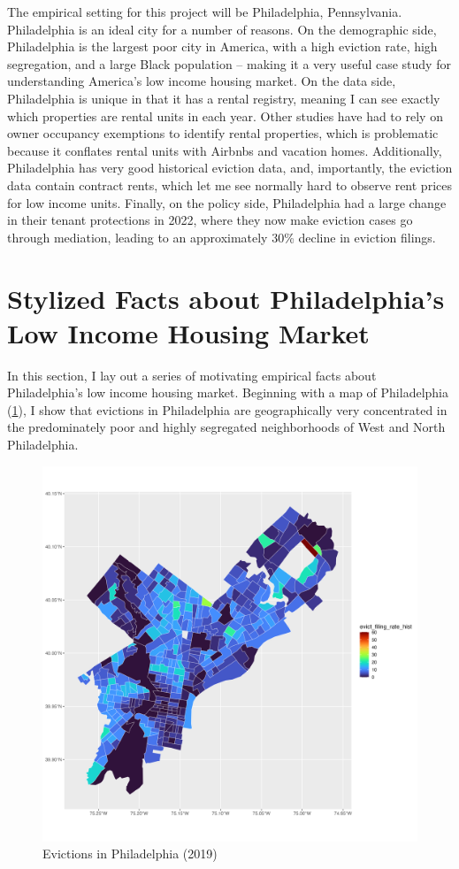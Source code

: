 \documentclass{article}
\begin{document}
The empirical setting for this project will be Philadelphia, Pennsylvania. Philadelphia is an ideal city for a number of reasons. On the demographic side, Philadelphia is the largest poor city in America, with a high eviction rate, high segregation, and a large Black population -- making it a very useful case study for understanding America's low income housing market. On the data side, Philadelphia is unique in that it has a rental registry, meaning I can see exactly which properties are rental units in each year. Other studies have had to rely on owner occupancy exemptions to identify rental properties, which is problematic because it conflates rental units with Airbnbs and vacation homes. Additionally, Philadelphia has very good historical eviction data, and, importantly, the eviction data contain contract rents, which let me see normally hard to observe rent prices for low income units. Finally, on the policy side, Philadelphia had a large change in their tenant protections in 2022, where they now make eviction cases go through mediation, leading to an approximately 30\% decline in eviction filings.

\section{Stylized Facts about Philadelphia's Low Income Housing Market}

In this section, I lay out a series of motivating empirical facts about Philadelphia's low income housing market. Beginning with a map of Philadelphia (\ref{fig:philly-map}), I show that evictions in Philadelphia are geographically very concentrated in the predominately poor and highly segregated neighborhoods of West and North Philadelphia.


\begin{figure}[htbp]
    \centering
    \includegraphics[width=0.6\linewidth]{figs/evict_filing_rate_hist.png}
    \caption{Evictions in Philadelphia (2019)}
    \label{fig:philly-map}
\end{figure}
\end{document}

